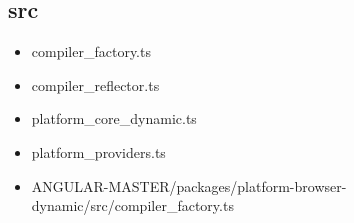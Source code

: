 \subsection{src}


\begin{itemize}
  \item compiler\_factory.ts
  \item compiler\_reflector.ts
  \item platform\_core\_dynamic.ts
  \item platform\_providers.ts
\end{itemize}






\begin{itemize}
  \item ANGULAR-MASTER/packages/platform-browser-dynamic/src/compiler\_factory.ts
\end{itemize}



